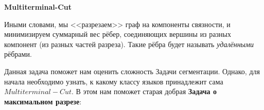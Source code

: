 \documentclass[a4paper,12pt]{article}
\begin{document}
\textbf{Multiterminal-Cut}
\begin{algorithmic}
\end{algorithmic}
Иными словами, мы <<разрезаем>> граф на компоненты связности, и минимизируем суммарный вес рёбер, соединяющих вершины из разных компонент (из разных частей разреза). Такие рёбра будет называть \textit{удалёнными} рёбрами. 

Данная задача поможет нам оценить сложность Задачи сегментации. Однако, для начала необходимо узнать, к какому классу языков принадлежит сама $Multiterminal-Cut$. В этом нам поможет старая добрая \textbf{Задача о максимальном разрезе}:
\end{document}
